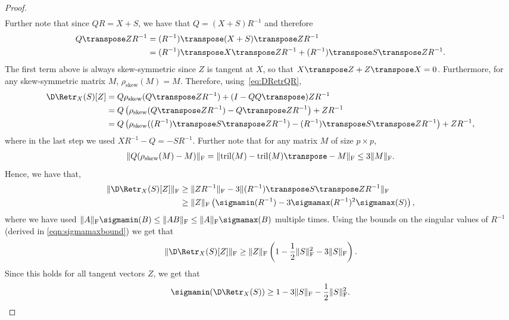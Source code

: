 \begin{proof}
\begin{align}
\end{align}
Further note that since $QR = X + S$, we have that $Q = (X+S)R^{-1}$ and therefore
\begin{align*}
	Q\transpose Z R^{-1} & = (R^{-1})\transpose (X+S)\transpose Z R^{-1} \nonumber\\
	& = (R^{-1})\transpose X\transpose Z R^{-1} + (R^{-1})\transpose S\transpose Z R^{-1}.
\end{align*}
The first term above is always skew-symmetric since $Z$ is tangent at $X$, so that $X\transpose Z + Z\transpose X = 0$. Furthermore, for any skew-symmetric matrix $M$, $\rho_{\mathrm{skew}}(M) = M$. Therefore, using~\eqref{eq:DRetrQR},
\begin{align}
	\D\Retr_X(S)[Z] & = Q\rho_{\mathrm{skew}}(Q\transpose Z R^{-1}) + (I-QQ\transpose) Z R^{-1} \nonumber \\
	& = Q\left(\rho_{\mathrm{skew}}(Q\transpose Z R^{-1}) - Q\transpose Z R^{-1} \right) + Z R^{-1} \nonumber\\
	& = Q\left(\rho_{\mathrm{skew}}((R^{-1})\transpose S\transpose Z R^{-1}) - (R^{-1})\transpose S\transpose Z R^{-1} \right) + Z R^{-1}, \label{eq:DRetrequalsplit}
\end{align}
where in the last step we used $XR^{-1} - Q = -SR^{-1}$.
Further note that for any matrix $M$ of size $p \times p$,
\begin{align}
	\|Q(\rho_{\mathrm{skew}}(M) - M)\|_{\mathrm{F}} = \|\mathrm{tril}(M) - \mathrm{tril}(M)\transpose - M\|_{\mathrm{F}} \leq 3 \|M\|_{\mathrm{F}}.
\end{align}
Hence, we have that,
\begin{align}
	\| \D\Retr_X(S)[Z] \|_{\mathrm{F}} & \geq \|ZR^{-1}\|_{\mathrm{F}} - 3\| (R^{-1})\transpose S\transpose Z R^{-1} \|_{\mathrm{F}} \nonumber\\
						& \geq \|Z\|_{\mathrm{F}} \left( \sigmamin(R^{-1}) - 3 \sigmamax(R^{-1})^2 \sigmamax(S) \right),
\end{align}
where we have used $\|A\|_{\mathrm{F}}\sigmamin(B) \leq \|AB\|_{\mathrm{F}} \leq \|A\|_{\mathrm{F}} \sigmamax(B)$ multiple times. Using the bounds on the singular values of $R^{-1}$ (derived in \eqref{eqn:sigmamaxbound}) we get that
\[
	\| \D\Retr_X(S)[Z] \|_{\mathrm{F}} \geq \|Z\|_{\mathrm{F}} \left( 1 - \frac{1}{2}\|S\|_{\mathrm{F}}^2 - 3 \|S\|_{\mathrm{F}} \right). %
\]
Since this holds for all tangent vectors $Z$, we get that
\[ \sigmamin(\D\Retr_X(S)) \geq 1 - 3 \|S\|_{\mathrm{F}} - \frac{1}{2}\|S\|_{\mathrm{F}}^2.\]

\end{proof}
